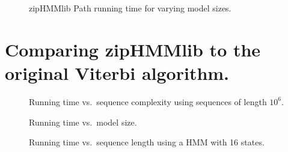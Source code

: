 \begin{figure}[H]
  \centering
  
  \caption{zipHMMlib Path running time for varying model sizes.}
  \label{fig:assymptotic_viterbi_path_k}
\end{figure}

%   

\section{Comparing zipHMMlib to the original Viterbi algorithm.}
\label{sec:comp-ziphmml-orig}

\begin{figure}[H]
  \centering
  
  \caption{Running time vs.\ sequence complexity using sequences of length $10^6$.}
  \label{fig:speedup_vs_complexity}
\end{figure}

\begin{figure}[H]
  \centering
  
  \caption{Running time vs.\ model size.}
  \label{fig:speedup_vs_k}
\end{figure}

\begin{figure}[H]
  \centering
  
  \caption{Running time vs.\ sequence length using a HMM with 16 states.}
  \label{fig:speedup_vs_sequence_length}
\end{figure}

